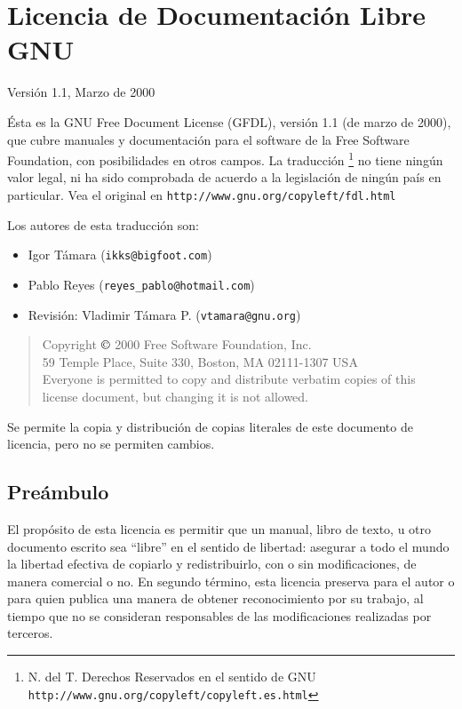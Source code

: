 
\chapter{Licencia de Documentación Libre GNU}

\label{GFDL}

Versión 1.1, Marzo de 2000

Ésta es la GNU Free Document  License (GFDL), versión 1.1 (de marzo de
2000),  que cubre  manuales  y  documentación para  el software  de la
Free  Software  Foundation,  con  posibilidades en  otros  campos.  La
traducción  \footnote{N.  del T.  Derechos  Reservados  en el  sentido
de   GNU  {\tt http://www.gnu.org/copyleft/copyleft.es.html}}   no
tiene  ningún  valor  legal,  ni  ha  sido  comprobada  de  acuerdo  a
la  legislación de  ningún  país  en particular.  Vea  el original  en
{\tt http://www.gnu.org/copyleft/fdl.html}

Los autores de esta traducción son:

\begin{itemize}
\item Igor Támara ({\tt ikks@bigfoot.com})
\item Pablo Reyes ({\tt reyes\_pablo@hotmail.com})
\item Revisión: Vladimir Támara P. ({\tt vtamara@gnu.org})
\end{itemize}

\begin{quote}
Copyright $\copyright$ 2000  Free Software Foundation, Inc.\\
      59 Temple Place, Suite 330, Boston, MA  02111-1307  USA\\
  Everyone is permitted to copy and distribute verbatim copies
  of this license document, but changing it is not allowed.
\end{quote}
  Se permite la copia y distribución de copias literales
  de este documento de licencia, pero no se permiten cambios.
  
 
\section*{Preámbulo}

El propósito  de esta  licencia es  permitir que  un manual,  libro de
texto,  u  otro documento  escrito  sea  ``libre''  en el  sentido  de
libertad: asegurar a todo el mundo  la libertad efectiva de copiarlo y
redistribuirlo, con o sin modificaciones, de manera comercial o no. En
segundo término,  esta licencia  preserva para el  autor o  para quien
publica una manera de obtener reconocimiento por su trabajo, al tiempo
que no se consideran responsables de las modificaciones realizadas por
terceros.

